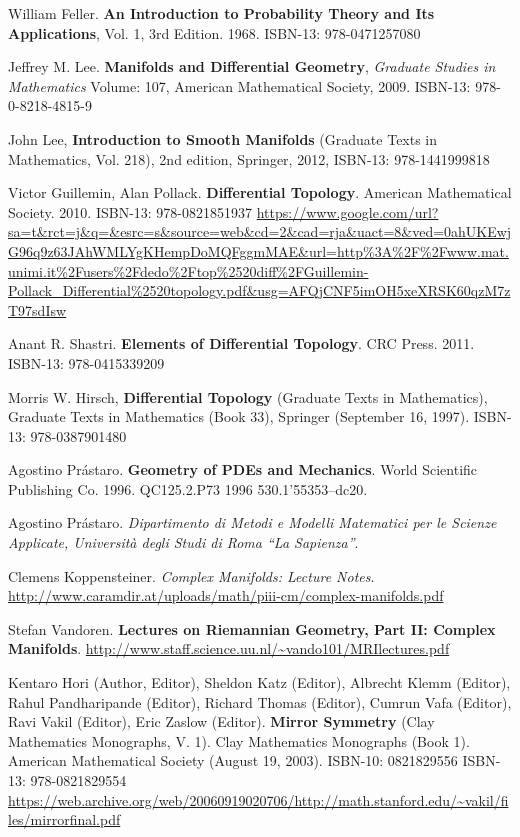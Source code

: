 \documentclass[10pt]{amsart}
\begin{document}
\begin{thebibliography}{9}

William Feller.  \textbf{An Introduction to Probability Theory and Its Applications}, Vol. 1, 3rd Edition.  1968.  ISBN-13: 978-0471257080



Jeffrey M. Lee. \textbf{Manifolds and Differential Geometry}, \emph{Graduate Studies in Mathematics} Volume: 107, American Mathematical Society, 2009. ISBN-13: 978-0-8218-4815-9

John Lee, \textbf{Introduction to Smooth Manifolds} (Graduate Texts in Mathematics, Vol. 218), 2nd edition, Springer,  2012, ISBN-13: 978-1441999818

Victor Guillemin, Alan Pollack. \textbf{Differential Topology}. American Mathematical Society. 2010. ISBN-13: 978-0821851937
\url{https://www.google.com/url?sa=t&rct=j&q=&esrc=s&source=web&cd=2&cad=rja&uact=8&ved=0ahUKEwjG96q9z63JAhWMLYgKHempDoMQFggmMAE&url=http\%3A\%2F\%2Fwww.mat.unimi.it\%2Fusers\%2Fdedo\%2Ftop\%2520diff\%2FGuillemin-Pollack_Differential\%2520topology.pdf&usg=AFQjCNF5imOH5xeXRSK60qzM7zT97sdIsw}

Anant R. Shastri. \textbf{Elements of Differential Topology}. CRC Press. 2011. ISBN-13: 978-0415339209

Morris W. Hirsch, \textbf{Differential Topology} (Graduate Texts in Mathematics), Graduate Texts in Mathematics (Book 33), Springer (September 16, 1997). ISBN-13: 978-0387901480

Agostino Pr\'{a}staro.  \textbf{Geometry of PDEs and Mechanics}.  World Scientific Publishing Co.  1996.  QC125.2.P73 1996  530.1'55353--dc20.  

Agostino Pr\'{a}staro.  \emph{Dipartimento di Metodi e Modelli Matematici per le Scienze Applicate, Universit\`{a} degli Studi di Roma ``La Sapienza''}.  

  Clemens Koppensteiner.  \emph{Complex Manifolds: Lecture Notes}.  \url{http://www.caramdir.at/uploads/math/piii-cm/complex-manifolds.pdf}
  

Stefan Vandoren. \textbf{Lectures on Riemannian Geometry, Part II: Complex Manifolds}.  \url{http://www.staff.science.uu.nl/~vando101/MRIlectures.pdf} 

Kentaro Hori (Author, Editor), Sheldon Katz (Editor), Albrecht Klemm (Editor), Rahul Pandharipande (Editor), Richard Thomas (Editor), Cumrun Vafa (Editor), Ravi Vakil (Editor), Eric Zaslow (Editor).  \textbf{Mirror Symmetry} (Clay Mathematics Monographs, V. 1).  Clay Mathematics Monographs (Book 1).  American Mathematical Society (August 19, 2003).  ISBN-10: 0821829556  ISBN-13: 978-0821829554  \url{https://web.archive.org/web/20060919020706/http://math.stanford.edu/~vakil/files/mirrorfinal.pdf}


\end{thebibliography}
\end{document}
